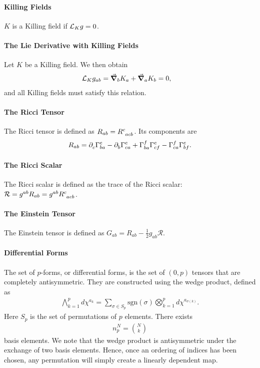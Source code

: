 \paragraph{Killing Fields}
$K$ is a Killing field if $\mathcal{L}_{K}g = 0$.

\paragraph{The Lie Derivative with Killing Fields}
Let $K$ be a Killing field. We then obtain
\begin{align*}
	\mathcal{L}_{K}g_{ab} &= \grad_{b}{K_{a}} + \grad_{a}{K_{b}} = 0,
\end{align*}
and all Killing fields must satisfy this relation.

\paragraph{The Ricci Tensor}
The Ricci tensor is defined as $R_{ab} = \tensor{R}{^{c}_{acb}}$. Its components are
\begin{align*}
	R_{ab} = \del{c}{\chris{c}{b}{a}} - \del{b}{\chris{c}{c}{a}} + \chris{f}{b}{a}\chris{c}{c}{f} - \chris{f}{c}{a}\chris{c}{b}{f} .
\end{align*}

\paragraph{The Ricci Scalar}
The Ricci scalar is defined as the trace of the Ricci scalar: $\mathcal{R} = g^{ab}R_{ab} = g^{ab}\tensor{R}{^{c}_{acb}}$.

\paragraph{The Einstein Tensor}
The Einstein tensor is defined as $G_{ab} = R_{ab} - \frac{1}{2}g_{ab}\mathcal{R}$.

\paragraph{Differential Forms}
The set of $p$-forms, or differential forms, is the set of $(0, p)$ tensors that are completely antisymmetric. They are constructed using the wedge product, defined as
\begin{align*}
	\bigwedge\limits_{k = 1}^{p}d\chi^{a_{k}} = \sum\limits_{\sigma\in S_{p}}\text{sgn}(\sigma)\bigotimes_{k = 1}^{p}d\chi^{a_{\sigma(k)}}.
\end{align*}
Here $S_{p}$ is the set of permutations of $p$ elements. There exists
\begin{align*}
	n_{p}^{N} = {N\choose k}
\end{align*}
basis elements. We note that the wedge product is antisymmetric under the exchange of two basis elements. Hence, once an ordering of indices has been chosen, any permutation will simply create a linearly dependent map.

